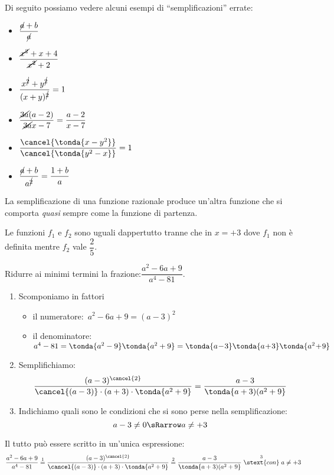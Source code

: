 Di seguito possiamo vedere alcuni esempi di ``semplificazioni'' errate:
\begin{htmulticols}{3}
\begin{itemize}
\item \(\dfrac{\cancel{a}+b}{\cancel{a}}\)
\item \(\dfrac{\cancel{x^2}+x+4}{\cancel{x^2}+2}\) 
\item \(\dfrac{x^{\cancel{2}}+y^{\cancel{2}}}{(x+y)^{\cancel{2}}}=1\) 
\item \(\dfrac{\cancel{3a}(a-2)}{\cancel{3a}x-7}=\dfrac{a-2}{x-7}\) 
\item \(\dfrac{\cancel{ \tonda{x-y^2}}}
            {\cancel{ \tonda{y^2-x}}}=1\)
\item \(\dfrac{\cancel{a}+b}{a^{\cancel{2}}}=\dfrac{1+b}{a}\)
\end{itemize}
\end{htmulticols}

La semplificazione di una funzione razionale produce un'altra funzione che si 
comporta \emph{quasi} sempre come la funzione di partenza.


Le funzioni \(f_1\) e \(f_2\) sono uguali dappertutto tranne che in \(x=+3\) 
dove \(f_1\) non è definita mentre \(f_2\) vale \(\dfrac{2}{5}\).

\begin{esempio}{}{}
Ridurre ai minimi termini la frazione:\quad \(\dfrac{a^{2}-6a+9}{a^{4}-81}\).
\begin{enumerate} [left=0mm]
\item Scomponiamo in fattori
\begin{itemize}[left=0mm, nosep]
\item il numeratore:~\(a^2 - 6a +9 = (a - 3 )^2\)
\item il denominatore:~\(a^4 - 81 = \tonda{a^2 - 9} \tonda{a^2 + 9} = 
                         \tonda{a\!-\!3}\tonda{a\!+\!3} \tonda{a^2\!+\!9} \)
\end{itemize}
\item Semplifichiamo:
\[\dfrac{(a-3)^{\cancel{2}}}
        {\cancel{(a-3)}\cdot (a+3)\cdot  \tonda{a^{2}+9} }=
  \dfrac{a-3}{\tonda{a+3)(a^{2}+9}}\]
\item Indichiamo quali sono le condizioni che si sono perse nella 
semplificazione:
\[a-3 \neq 0 \sRarrow a \neq +3\]
\end{enumerate}
Il tutto può essere scritto in un'unica espressione:
\[\dfrac{a^{2}-6a+9}{a^{4}-81} \stackrel{1}{=} 
  \dfrac{(a-3)^{\cancel{2}}}
        {\cancel{(a-3)}\cdot (a+3)\cdot \tonda{a^{2}+9}}\stackrel{2}{=} 
  \dfrac{a-3}{ \tonda{a+3)(a^{2}+9}} \stackrel{3}{\stext{con}} 
  a \neq +3\]
\end{esempio}

